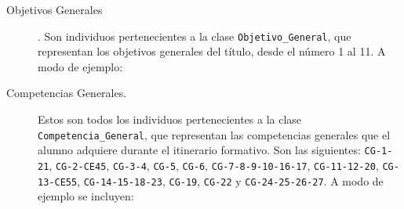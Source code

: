   
  
	\begin{description}


		\item [Objetivos Generales]. Son individuos pertenecientes a la clase \lstinline!Objetivo_General!, que representan los objetivos generales del título, desde el número 1 al 11. A modo de ejemplo:
	 	

		
 		
	 
		\item [Competencias Generales.] Estos son todos los individuos pertenecientes a la clase \lstinline!Competencia_General!, que representan las competencias generales que el alumno adquiere durante el itinerario formativo. Son las siguientes: \lstinline!CG-1-21!, \lstinline!CG-2-CE45!, \lstinline!CG-3-4!, \lstinline!CG-5!, \lstinline!CG-6!, \lstinline!CG-7-8-9-10-16-17!, \lstinline!CG-11-12-20!, \lstinline!CG-13-CE55!, \lstinline!CG-14-15-18-23!, \lstinline!CG-19!, \lstinline!CG-22! y \lstinline!CG-24-25-26-27!. A modo de ejemplo se incluyen:
		
 	 	
 	 	
 	


\end{description}
